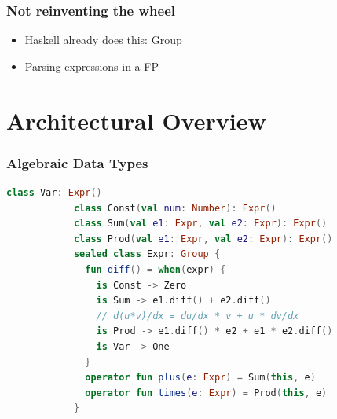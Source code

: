 \documentclass{beamer}
\begin{document}



    \begin{frame}
        \frametitle{Not reinventing the wheel}
        \begin{itemize}
            \item Haskell already does this: Group
            \item Parsing expressions in a FP
        \end{itemize}
    \end{frame}


    \section{Architectural Overview}\label{sec:third-section}

    \begin{frame}[fragile]
        \frametitle{Algebraic Data Types}
        \begin{lstlisting}[language=Kotlin, gobble=12]
            class Var: Expr()
            class Const(val num: Number): Expr()
            class Sum(val e1: Expr, val e2: Expr): Expr()
            class Prod(val e1: Expr, val e2: Expr): Expr()
            sealed class Expr: Group {
              fun diff() = when(expr) {
                is Const -> Zero
                is Sum -> e1.diff() + e2.diff()
                // d(u*v)/dx = du/dx * v + u * dv/dx
                is Prod -> e1.diff() * e2 + e1 * e2.diff()
                is Var -> One
              }
              operator fun plus(e: Expr) = Sum(this, e)
              operator fun times(e: Expr) = Prod(this, e)
            }
        \end{lstlisting}
    \end{frame}
\end{document}
